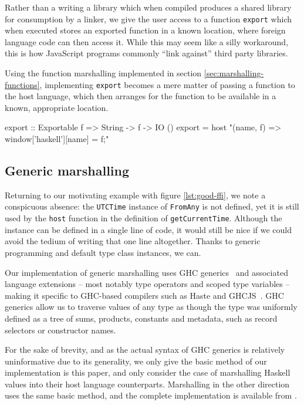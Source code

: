 \documentclass[preprint]{sigplanconf}
\begin{document}
Rather than a writing a library which when compiled produces a shared library
for consumption by a linker, we give the user access to a function
\lstinline!export! which when executed stores an exported function in a
known location, where foreign language code can then access it.
While this may seem like a silly workaround, this is how JavaScript programs
commonly ``link against'' third party libraries.

Using the function marshalling implemented in section
\ref{sec:marshalling-functions}, implementing \lstinline!export! becomes a
mere matter of passing a function to the host language, which then
arranges for the function to be available in a known, appropriate location.

\begin{code}
  export :: Exportable f => String -> f -> IO ()
  export =
    host "(name, f) => window['haskell'][name] = f;"
\end{code}

\subsection{Generic marshalling}
\label{sec:default-instances}
Returning to our motivating example with figure \ref{lst:good-ffi}, we note
a conspicuous absence: the \lstinline!UTCTime! instance of \lstinline!FromAny!
is not defined, yet it is still used by the \lstinline!host! function in the
definition of \lstinline!getCurrentTime!. Although the instance can be defined
in a single line of code, it would still be nice if we could avoid the tedium
of writing that one line altogether. Thanks to generic programming and default
type class instances, we can.

Our implementation of generic marshalling uses GHC generics\ \cite{generics}
and associated language extensions -- most notably type operators and scoped
type variables -- making it specific to GHC-based compilers such as Haste and
GHCJS\ \cite{ghcjs}. GHC generics allow us to traverse values of any type
as though the type was uniformly defined as a tree of sums, products,
constants and metadata, such as record selectors or constructor names.

For the sake of brevity, and as the actual syntax of GHC generics is
relatively uninformative due to its generality, we only give the basic method
of our implementation is this paper, and only consider the case of marshalling
Haskell values into their host language counterparts.
Marshalling in the other direction uses the same basic method,
and the complete implementation is available from \cite{haste-lang.org}.
\end{document}
